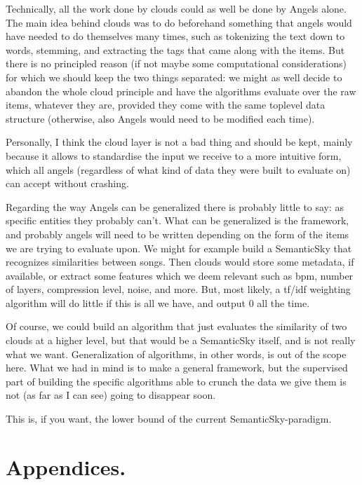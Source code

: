 \documentclass[11pt]{article}
\begin{document}
Technically, all the work done by clouds could as well be done by Angels alone. The main idea behind clouds was to do beforehand something that angels would have needed to do themselves many times, such as tokenizing the text down to words, stemming, and extracting the tags that came along with the items. But there is no principled reason (if not maybe some computational considerations) for which we should keep the two things separated: we might as well decide to abandon the whole cloud principle and have the algorithms evaluate over the raw items, whatever they are, provided they come with the same toplevel data structure (otherwise, also Angels would need to be modified each time).

Personally, I think the cloud layer is not a bad thing and should be kept, mainly because it allows to standardise the input we receive to a more intuitive form, which all angels (regardless of what kind of data they were built to evaluate on) can accept without crashing.

Regarding the way Angels can be generalized there is probably little to say: as specific entities they probably can't. What can be generalized is the framework, and probably angels will need to be written depending on the form of the items we are trying to evaluate upon. We might for example build a SemanticSky that recognizes similarities between songs. Then clouds would store some metadata, if available, or extract some features which we deem relevant such as bpm, number of layers, compression level, noise, and more. But, most likely, a tf/idf weighting algorithm will do little if this is all we have, and output 0 all the time.

Of course, we could build an algorithm that just evaluates the similarity of two clouds at a higher level, but that would be a SemanticSky itself, and is not really what we want. Generalization of algorithms, in other words, is out of the scope here. What we had in mind is to make a general framework, but the supervised part of building the specific algorithms able to crunch the data we give them is not (as far as I can see) going to disappear soon.

This is, if you want, the lower bound of the current SemanticSky-paradigm.






\part{Appendices.}
\end{document}

